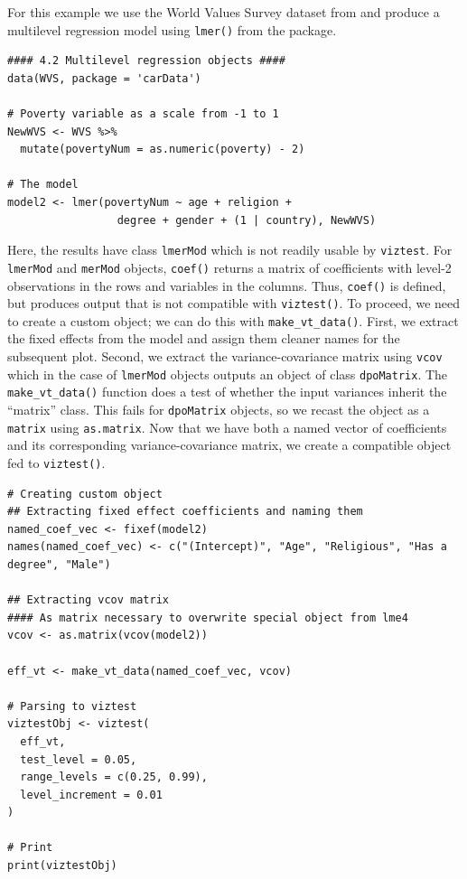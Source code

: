 For this example we use the World Values Survey dataset from  and produce a multilevel regression model using \texttt{lmer()} from the  package.

\begin{verbatim}
#### 4.2 Multilevel regression objects ####
data(WVS, package = 'carData')

# Poverty variable as a scale from -1 to 1
NewWVS <- WVS %>%
  mutate(povertyNum = as.numeric(poverty) - 2)

# The model
model2 <- lmer(povertyNum ~ age + religion +
                 degree + gender + (1 | country), NewWVS)
\end{verbatim}

Here, the results have class \texttt{lmerMod} which is not readily usable by \texttt{viztest}. For \texttt{lmerMod} and \texttt{merMod} objects, \texttt{coef()} returns a matrix of coefficients with level-2 observations in the rows and variables in the columns. Thus, \texttt{coef()} is defined, but produces output that is not compatible with \texttt{viztest()}. To proceed, we need to create a custom object; we can do this with \texttt{make\_vt\_data()}. First, we extract the fixed effects from the model and assign them cleaner names for the subsequent plot. Second, we extract the variance-covariance matrix using \texttt{vcov} which in the case of \texttt{lmerMod} objects outputs an object of class \texttt{dpoMatrix}. The \texttt{make\_vt\_data()} function does a test of whether the input variances inherit the ``matrix'' class. This fails for \texttt{dpoMatrix} objects, so we recast the object as a \texttt{matrix} using \texttt{as.matrix}. Now that we have both a named vector of coefficients and its corresponding variance-covariance matrix, we create a compatible object fed to \texttt{viztest()}.

\begin{verbatim}
# Creating custom object
## Extracting fixed effect coefficients and naming them
named_coef_vec <- fixef(model2)
names(named_coef_vec) <- c("(Intercept)", "Age", "Religious", "Has a degree", "Male")

## Extracting vcov matrix
#### As matrix necessary to overwrite special object from lme4
vcov <- as.matrix(vcov(model2))

eff_vt <- make_vt_data(named_coef_vec, vcov)

# Parsing to viztest
viztestObj <- viztest(
  eff_vt,
  test_level = 0.05,
  range_levels = c(0.25, 0.99),
  level_increment = 0.01
)

# Print
print(viztestObj)
\end{verbatim}

